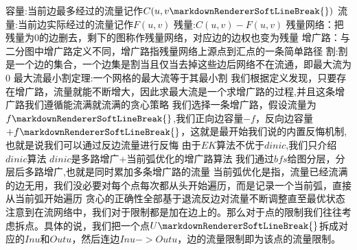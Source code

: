 {}容量:当前边最多经过的流量记作$ C(u,v\markdownRendererSoftLineBreak
{}) $\markdownRendererParagraphSeparator
{}流量:当前边实际经过的流量记作$ F(u,v) $\markdownRendererParagraphSeparator
{}残量:$ C(u,v)-F(u,v) $\markdownRendererParagraphSeparator
{}残量网络：把残量为0的边删去，剩下的图称作残量网络，对应边的边权也变为残量\markdownRendererParagraphSeparator
{}增广路：与二分图中增广路定义不同，增广路指残量网络上源点到汇点的一条简单路径\markdownRendererParagraphSeparator
{}割:割是一个边的集合，一个边集是割当且仅当去掉这些边后网络不在流通，即最大流为$ 0 $\markdownRendererParagraphSeparator
{}最大流最小割定理:一个网格的最大流等于其最小割\markdownRendererParagraphSeparator
{}我们根据定义发现，只要存在增广路，流量就能不断增大，因此求最大流是一个求增广路的过程,并且这条增广路我们遵循能流满就流满的贪心策略\markdownRendererParagraphSeparator
{}我们选择一条增广路，假设流量为$ f\markdownRendererSoftLineBreak
{}$,我们正向边容量$ -f $，反向边容量$ +f\markdownRendererSoftLineBreak
{}$，这就是最开始我们说的内置反悔机制,也就是说我们可以通过反边流量进行反悔\markdownRendererParagraphSeparator
{}由于$ EK $算法不优于$ dinic $,我们只介绍$ dinic $算法\markdownRendererParagraphSeparator
{}$ dinic $是多路增广+当前弧优化的增广路算法\markdownRendererParagraphSeparator
{}我们通过$ bfs $给图分层，分层后多路增广,也就是同时累加多条增广路的流量\markdownRendererParagraphSeparator
{}当前弧优化是指，流量已经流满的边无用，我们没必要对每个点每次都从头开始遍历，而是记录一个当前弧，直接从当前弧开始遍历\markdownRendererParagraphSeparator
{}贪心的正确性全部基于退流反边对流量不断调整直至最优状态\markdownRendererInterblockSeparator
{}\markdownRendererSectionBegin
{}\markdownRendererInterblockSeparator
{}注意到在流网络中，我们对于限制都是加在边上的。那么对于点的限制我们往往考虑拆点。具体的说，我们把一个点$ U\markdownRendererSoftLineBreak
{}$拆成对应的$ Inu $和$ Outu $，然后连边$ Inu->Outu $，边的流量限制即为该点的流量限制。\markdownRendererInterblockSeparator
{}
\markdownRendererSectionEnd \markdownRendererSectionBegin
{}\markdownRendererInterblockSeparator
{}\markdownRendererInterblockSeparator
{}
\markdownRendererSectionEnd \markdownRendererSectionBegin
{}\markdownRendererInterblockSeparator
{}\markdownRendererSectionBegin
{}\markdownRendererInterblockSeparator
{}\markdownRendererInterblockSeparator

